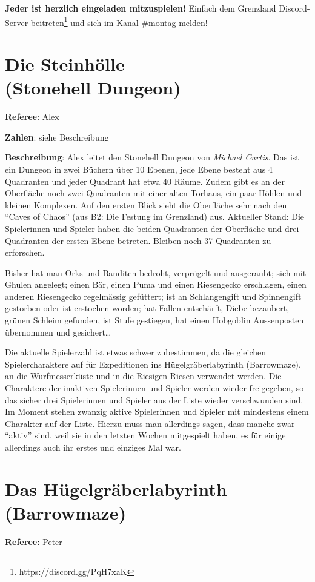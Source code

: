 \documentclass[11pt]{wbzine}
\begin{document}
\begin{multicols}{2}
\textbf{Jeder ist herzlich eingeladen mitzuspielen!} Einfach dem Grenzland
Discord-Server beitreten\footnote{https://discord.gg/PqH7xaK} und
sich im Kanal \#montag melden!


\section{Die Steinhölle\\ (Stonehell Dungeon)}
\label{stonehell}
\textbf{Referee}: Alex

\textbf{Zahlen}: siehe Beschreibung

    \textbf{Beschreibung}: Alex leitet den Stonehell Dungeon von
    \textit{Michael Curtis}. Das ist ein Dungeon in zwei Büchern
    über 10 Ebenen, jede Ebene besteht aus 4 Quadranten und jeder
    Quadrant hat etwa 40 Räume. Zudem gibt es an der Oberfläche noch
    zwei Quadranten mit einer alten Torhaus, ein paar Höhlen und
    kleinen Komplexen. Auf den ersten Blick sieht die Oberfläche
    sehr nach den “Caves of Chaos” (aus B2: Die Festung im
    Grenzland) aus. Aktueller Stand: Die
    Spielerinnen und Spieler haben die beiden Quadranten der
    Oberfläche und drei Quadranten der ersten Ebene betreten.
    Bleiben noch 37 Quadranten zu erforschen.

    Bisher hat man Orks und Banditen bedroht, verprügelt und
    ausgeraubt; sich mit Ghulen angelegt; einen Bär, einen Puma und
    einen Riesengecko erschlagen, einen anderen Riesengecko
    regelmässig gefüttert; ist an Schlangengift und Spinnengift
    gestorben oder ist erstochen worden; hat Fallen entschärft,
    Diebe bezaubert, grünen Schleim gefunden, ist Stufe gestiegen,
    hat einen Hobgoblin Aussenposten übernommen und gesichert…

    Die aktuelle Spielerzahl ist etwas schwer zubestimmen, da die
    gleichen Spielercharaktere auf für Expeditionen ins
    Hügelgräberlabyrinth (Barrowmaze), an die Wurfmesserküste und in
    die Riesigen Riesen verwendet werden. Die Charaktere der
    inaktiven Spielerinnen und Spieler werden wieder freigegeben, so
    das sicher drei Spielerinnen und Spieler aus der Liste wieder
    verschwunden sind. Im Moment stehen zwanzig aktive Spielerinnen
    und Spieler mit mindestens einem Charakter auf der Liste. Hierzu
    muss man allerdings sagen, dass manche zwar “aktiv” sind, weil sie in
    den letzten Wochen mitgespielt haben, es für einige allerdings
    auch ihr erstes und einziges Mal war.


\section{Das Hügelgräberlabyrinth (Barrowmaze)}
\label{barrowmaze}
\textbf{Referee:} Peter


\end{multicols}
\end{document}
